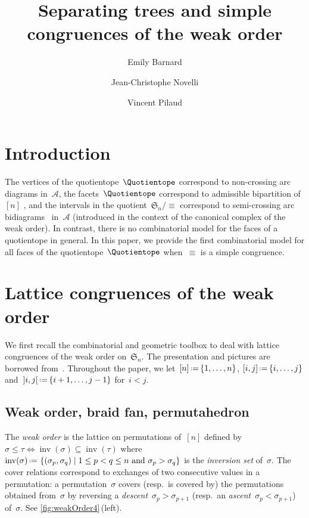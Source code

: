 \documentclass{amsart}
\title[Separating trees and simple comgruences]{Separating trees and simple congruences of the weak order}
\author{Emily Barnard}
\author{Jean-Christophe Novelli}
\author{Vincent Pilaud}
\theoremstyle{definition}
\newcommand{\f}[1]{{\mathfrak{#1}}} %
\newcommand{\set}[2]{\left\{ #1 \;\middle|\; #2 \right\}} %
\newcommand{\eqdef}{\mbox{\,\raisebox{0.2ex}{\scriptsize\ensuremath{\mathrm:}}\ensuremath{=}\,}} %
\DeclareMathOperator{\inv}{inv} %
\newcommand{\darkblue}{\color{darkblue}} %
\newcommand{\defn}[1]{\textsl{\darkblue #1}} %
\newcommand{\arcs}{{\mathcal{A}}} %
\begin{document}
\begin{abstract}
\end{abstract}

\maketitle



\section{Introduction}
\label{sec:introduction}

The vertices of the quotientope~$\Quotientope$ correspond to non-crossing arc diagrams in~$\arcs$, the facets~$\Quotientope$ correspond to admissible bipartition of~$[n]$ \cite{AlbertinPilaudRitter}, and the intervals in the quotient~$\f{S}_n/{\equiv}$ correspond to semi-crossing arc bidiagrams~\cite{AlbertinPilaud} in~$\arcs$ (introduced in the context of the canonical complex of the weak order).
In contrast, there is no combinatorial model for the faces of a quotientope in general.
In this paper, we provide the first combinatorial model for all faces of the quotientope~$\Quotientope$ when~$\equiv$ is a simple congruence.


\clearpage
\section{Lattice congruences of the weak order}
\label{sec:latticeCongruences}

We first recall the combinatorial and geometric toolbox to deal with lattice congruences of the weak order on~$\f{S}_n$.
The presentation and pictures are borrowed from~\cite{PilaudSantos-quotientopes, PadrolPilaudRitter}.
Throughout the paper, we let~$[n] \eqdef \{1, \dots, n\}$, $[i,j] \eqdef \{i, \dots, j\}$ and~${{]i,j[} \eqdef \{i+1, \dots, j-1\}}$ for~$i < j$.


\subsection{Weak order, braid fan, permutahedron}
\label{subsec:weakOrder}

The \defn{weak order} is the lattice on permutations of~$[n]$ defined by ${\sigma \le \tau \iff \inv(\sigma) \subseteq \inv(\tau)}$ where~$\inv(\sigma) \eqdef \set{(\sigma_p, \sigma_q)}{1 \le p < q \le n \text{ and } \sigma_p > \sigma_q}$ is the \defn{inversion set} of~$\sigma$.
The cover relations correspond to exchanges of two consecutive values in a permutation: a permutation~$\sigma$ covers (resp.~is covered by) the permutations obtained from~$\sigma$ by reversing a \defn{descent}~$\sigma_p > \sigma_{p+1}$ (resp.~an \defn{ascent}~$\sigma_p < \sigma_{p+1}$) of~$\sigma$.
See \cref{fig:weakOrder4}\,(left).
\end{document}
